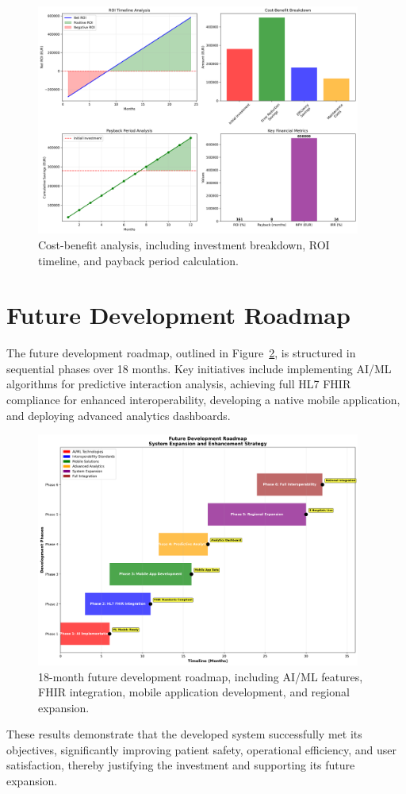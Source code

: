 \begin{figure}[htbp]
    \centering
    \includegraphics[width=0.95\textwidth]{images/generated/roi_analysis.png}
    \caption{Cost-benefit analysis, including investment breakdown, ROI timeline, and payback period calculation.}
    \label{fig:roi-analysis}
\end{figure}

\section{Future Development Roadmap}

The future development roadmap, outlined in Figure~\ref{fig:future-roadmap}, is structured in sequential phases over 18 months. Key initiatives include implementing AI/ML algorithms for predictive interaction analysis, achieving full HL7 FHIR compliance for enhanced interoperability, developing a native mobile application, and deploying advanced analytics dashboards.

\begin{figure}[htbp]
    \centering
    \includegraphics[width=0.95\textwidth]{images/generated/future_roadmap.png}
    \caption{18-month future development roadmap, including AI/ML features, FHIR integration, mobile application development, and regional expansion.}
    \label{fig:future-roadmap}
\end{figure}

These results demonstrate that the developed system successfully met its objectives, significantly improving patient safety, operational efficiency, and user satisfaction, thereby justifying the investment and supporting its future expansion. 